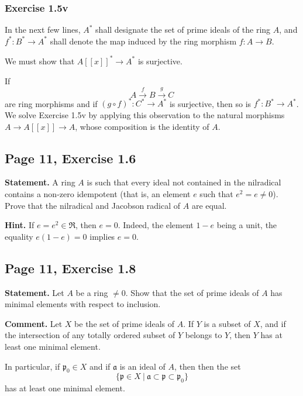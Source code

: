 \documentclass[parskip=half,fontsize=12pt]{scrartcl}%
\newcommand{\mf}{\mathfrak}
\newcommand{\aaa}{\mf a}
\newcommand{\ppp}{\mf p}
\begin{document}
\subsubsection{Exercise 1.5v}%

In the next few lines, $A^*$ shall designate the set of prime ideals of the ring $A$, and $f^*:B^*\to A^*$ shall denote the map induced by the ring morphism $f:A\to B$. 

We must show that $A[[x]]^*\to A^*$ is surjective.

If 
$$
A\xrightarrow fB\xrightarrow gC
$$ 
are ring morphisms and if $(g\circ f)^*:C^*\to A^*$ is surjective, then so is $f^*:B^*\to A^*$. We solve Exercise 1.5v by applying this observation to the natural morphisms $A\to A[[x]]\to A$, whose composition is the identity of $A$. 

\subsection{Page 11, Exercise 1.6}%

\textbf{Statement.} A ring $A$ is such that every ideal not contained in the nilradical contains a non-zero idempotent (that is, an element $e$ such that $e^2=e\ne0$). Prove that the nilradical and Jacobson radical of $A$ are equal.

\textbf{Hint.} If $e=e^2\in\mf R$, then $e=0$. Indeed, the element $1-e$ being a unit, the equality $e(1-e)=0$ implies $e=0$.

\subsection{Page 11, Exercise 1.8}\label{vp1}%

\textbf{Statement.} Let $A$ be a ring $\ne0$. Show that the set of prime ideals of $A$ has minimal elements with respect to inclusion.

\textbf{Comment.} Let $X$ be the set of prime ideals of $A$. If $Y$ is a subset of $X$, and if the intersection of any totally ordered subset of $Y$ belongs to $Y$, then $Y$ has at least one minimal element.

In particular, if $\ppp_0\in X$ and if $\aaa$ is an ideal of $A$, then then the set 
$$
\{\ppp\in X\ |\ \aaa\subset\ppp\subset\ppp_0\}
$$ 
has at least one minimal element.
\end{document}
